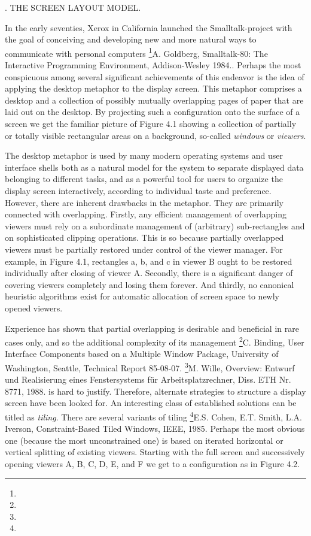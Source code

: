 . THE SCREEN LAYOUT MODEL.

In the early seventies, Xerox  in California launched the
Smalltalk-project with the goal of conceiving and developing new and
more natural ways to communicate with personal computers
\footnote{{\mc[1]}}{A. Goldberg, Smalltalk-80: The Interactive Programming Environment, Addison-Wesley 1984.}. Perhaps the most conspicuous among several significant
achievements of this endeavor is the idea of applying the desktop
metaphor to the display screen. This metaphor comprises a desktop and
a collection of possibly mutually overlapping pages of paper that are
laid out on the desktop. By projecting such a configuration onto the
surface of a screen we get the familiar picture of Figure 4.1 showing
a collection of partially or totally visible rectangular areas on a
background, so-called \emph{windows} or \emph{viewers}.


The desktop metaphor is used by many modern operating systems and user
interface shells both as a natural model for the system to separate
displayed data belonging to different tasks, and as a powerful tool
for users to organize the display screen interactively, according to
individual taste and preference. However, there are inherent drawbacks
in the metaphor. They are primarily connected with
overlapping. Firstly, any efficient management of overlapping viewers
must rely on a subordinate management of (arbitrary) sub-rectangles
and on sophisticated clipping operations. This is so because partially
overlapped viewers must be partially restored under control of the
viewer manager. For example, in Figure 4.1, rectangles a, b, and c in
viewer B ought to be restored individually after closing of viewer
A. Secondly, there is a significant danger of covering viewers
completely and losing them forever. And thirdly, no canonical
heuristic algorithms exist for automatic allocation of screen space to
newly opened viewers.

Experience has shown that partial overlapping is desirable and
beneficial in rare cases only, and so the additional complexity of its
management \footnote{{\mc[1]}}{C. Binding, User Interface Components based on a Multiple Window Package, University of Washington, Seattle, Technical Report 85-08-07.}
\footnote{{\mc[2]}}{M. Wille, Overview: Entwurf und Realisierung eines Fenstersystems für Arbeitsplatzrechner, Diss. ETH Nr. 8771, 1988.}
is hard to justify. Therefore, alternate
strategies to structure a display screen have been looked for. An
interesting class of established solutions can be titled as \emph{tiling}.
There are several variants of tiling \footnote{{\mc[3]}}{E.S. Cohen, E.T. Smith, L.A. Iverson, Constraint-Based Tiled Windows, IEEE, 1985}. Perhaps the
most obvious one (because the most unconstrained one) is based on
iterated horizontal or vertical splitting of existing
viewers. Starting with the full screen and successively opening
viewers A, B, C, D, E, and F we get to a configuration as in Figure
4.2.

